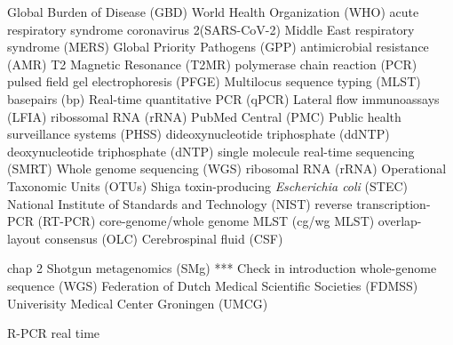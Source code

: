 Global Burden of Disease (GBD)
World Health Organization (WHO)
acute  respiratory  syndrome  coronavirus  2(SARS-CoV-2)
Middle East respiratory syndrome (MERS)
Global Priority Pathogens (GPP)
antimicrobial resistance (AMR)
T2 Magnetic Resonance (T2MR)
polymerase chain reaction (PCR)
pulsed field gel electrophoresis (PFGE)
Multilocus sequence typing (MLST)
basepairs (bp)
Real-time quantitative PCR (qPCR)
Lateral flow immunoassays (LFIA)
ribossomal RNA (rRNA)
PubMed Central\textsuperscript{\small\textregistered} (PMC)
Public health surveillance systems (PHSS)
dideoxynucleotide triphosphate (ddNTP) 
deoxynucleotide triphosphate (dNTP)
single molecule real-time sequencing (SMRT)
Whole genome sequencing (WGS)
ribosomal RNA (rRNA)
Operational Taxonomic Units (OTUs)
Shiga toxin-producing \textit{Escherichia coli} (STEC)
National Institute of Standards and Technology (NIST)
reverse transcription-PCR (RT-PCR)
core-genome/whole genome MLST (cg/wg MLST)
overlap-layout consensus (OLC)
Cerebrospinal fluid (CSF)

chap 2 
Shotgun metagenomics (SMg) *** Check in introduction
whole-genome sequence (WGS)
Federation of Dutch Medical Scientific Societies (FDMSS)
Univerisity Medical Center Groningen (UMCG)

R-PCR real time 